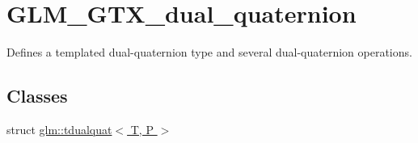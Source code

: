 \hypertarget{group__gtx__dual__quaternion}{\section{G\-L\-M\-\_\-\-G\-T\-X\-\_\-dual\-\_\-quaternion}
\label{group__gtx__dual__quaternion}
}


Defines a templated dual-\/quaternion type and several dual-\/quaternion operations.  


\subsection*{Classes}
\begin{DoxyCompactItemize}
\item 
struct \hyperlink{structglm_1_1tdualquat}{glm\-::tdualquat$<$ T, P $>$}
\end{DoxyCompactItemize}
